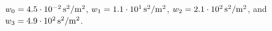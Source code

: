 $w_{0}=\unit[4.5 \cdot 10^{-2}]{s^2/m^2}$, $w_{1}=\unit[1.1 \cdot 10^{1}]{s^2/m^2}$, $w_{2}=\unit[2.1 \cdot 10^{2}]{s^2/m^2}$, and $w_{3}=\unit[4.9 \cdot 10^{2}]{s^2/m^2}$.